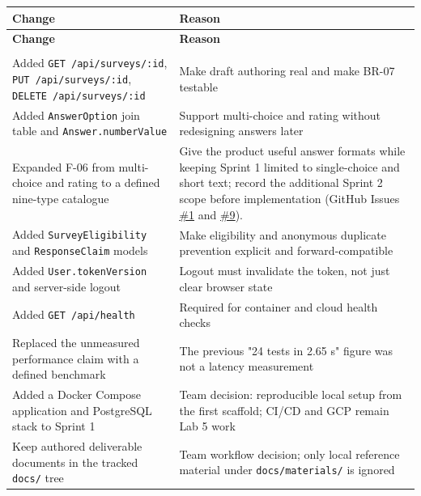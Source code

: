 \documentclass[12pt,a4paper]{article}
\begin{document}
{\setlength{\tabcolsep}{3pt}\renewcommand{\arraystretch}{1.08}\small
\begin{longtable}{@{}>{\raggedright\arraybackslash}p{}>{\raggedright\arraybackslash}p{}@{}}
\toprule
\textbf{Change} & \textbf{Reason} \\
\midrule
\endfirsthead
\toprule
\textbf{Change} & \textbf{Reason} \\
\midrule
\endhead
\midrule
\multicolumn{2}{r}{\footnotesize\textit{Continued on next page}}\\
\endfoot
\bottomrule
\endlastfoot
Added \texttt{GET /api/surveys/:id}, \texttt{PUT /api/surveys/:id}, \texttt{DELETE /api/surveys/:id} & Make draft authoring real and make BR-07 testable \\
Added \texttt{AnswerOption} join table and \texttt{Answer.numberValue} & Support multi-choice and rating without redesigning answers later \\
Expanded F-06 from multi-choice and rating to a defined nine-type catalogue & Give the product useful answer formats while keeping Sprint 1 limited to single-choice and short text; record the additional Sprint 2 scope before implementation (GitHub Issues \href{https://github.com/Snnn3/SurveyHub/issues/1}{\#1} and \href{https://github.com/Snnn3/SurveyHub/issues/9}{\#9}). \\
Added \texttt{SurveyEligibility} and \texttt{ResponseClaim} models & Make eligibility and anonymous duplicate prevention explicit and forward-compatible \\
Added \texttt{User.tokenVersion} and server-side logout & Logout must invalidate the token, not just clear browser state \\
Added \texttt{GET /api/health} & Required for container and cloud health checks \\
Replaced the unmeasured performance claim with a defined benchmark & The previous "24 tests in 2.65 s" figure was not a latency measurement \\
Added a Docker Compose application and PostgreSQL stack to Sprint 1 & Team decision: reproducible local setup from the first scaffold; CI/CD and GCP remain Lab 5 work \\
Keep authored deliverable documents in the tracked \texttt{docs/} tree & Team workflow decision; only local reference material under \texttt{docs/materials/} is ignored \\
\end{longtable}}

\end{document}
